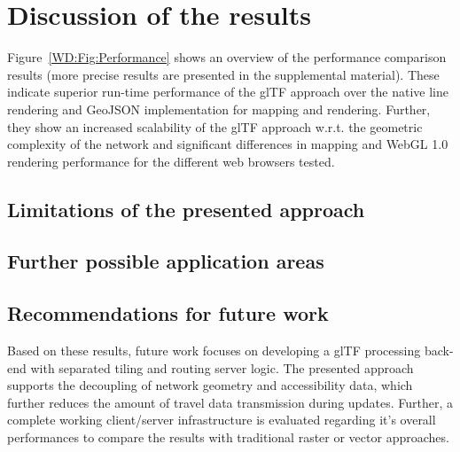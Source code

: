 
\cleardoublepage              %
\chapter{Discussion of the results}
  Figure~\ref{WD:Fig:Performance} shows an overview of the performance comparison
  results (more precise results are presented in the supplemental material).
  These indicate superior run-time performance of the glTF approach over
  the native line rendering and GeoJSON implementation for mapping and rendering.
  Further, they show an increased scalability of the glTF approach w.r.t. the
  geometric complexity of the network and significant differences in mapping
  and WebGL 1.0 rendering performance for the different web browsers tested.\par
  \section{Limitations of the presented approach}
  \section{Further possible application areas}
  \section{Recommendations for future work}
    Based on these results, future work focuses on developing a glTF processing
    back-end with separated tiling and routing server logic. The presented approach
    supports the decoupling of network geometry and accessibility data, which further
    reduces the amount of travel data transmission during updates. Further, a complete
    working client/server infrastructure is evaluated regarding it's overall
    performances to compare the results with traditional raster or vector approaches.\par

